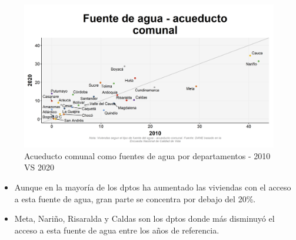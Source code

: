     \begin{figure}[H]
        \caption{Acueducto comunal como fuentes de agua por departamentos - 2010 VS 2020 \label{map_result_2} }
        \begin{center}
        \includegraphics[width=\textwidth,keepaspectratio]{img/var_133_scatter_time.png}
        \end{center}
    \end{figure}
            \begin{itemize}
                    \item Aunque en la mayoría de los dptos ha aumentado las viviendas con el acceso a esta fuente de agua, gran parte se concentra por debajo del 20\%.
                    \item Meta, Nariño, Risaralda y Caldas son los dptos donde más disminuyó el acceso a esta fuente de agua entre los años de referencia.
                    \end{itemize}

